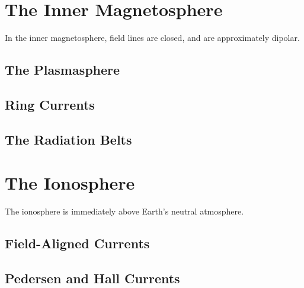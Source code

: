 \section{The Inner Magnetosphere}

In the inner magnetosphere, field lines are closed, and are approximately dipolar. 

\subsection{The Plasmasphere}

\subsection{Ring Currents}

\subsection{The Radiation Belts}

\section{The Ionosphere}

The ionosphere is immediately above Earth's neutral atmosphere. 


\subsection{Field-Aligned Currents}

\subsection{Pedersen and Hall Currents}

